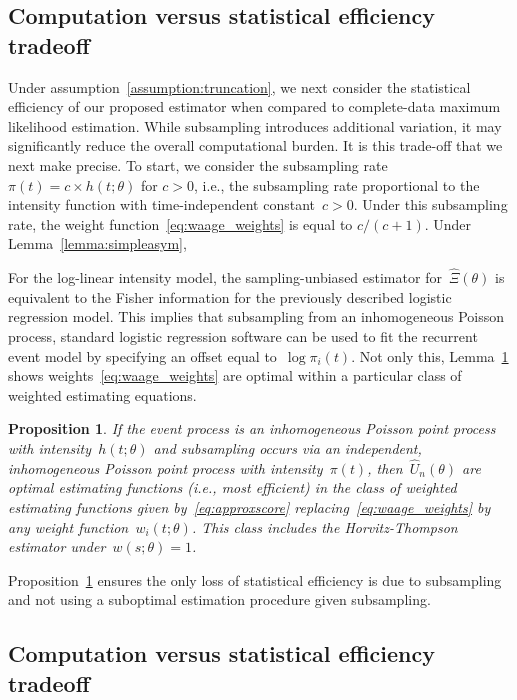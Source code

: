 \documentclass[11pt]{amsart}
\newtheorem{prop}[thm]{Proposition}
\begin{document}
\subsection{Computation versus statistical efficiency tradeoff}

Under assumption~\ref{assumption:truncation}, we next consider the statistical efficiency of our proposed estimator when compared to complete-data maximum likelihood estimation. While subsampling introduces additional variation, it may significantly reduce the overall computational burden. It is this trade-off that we next make precise. To start, we consider the subsampling rate~$\pi(t) = c \times h(t; \theta)$ for $c>0$, i.e., the subsampling rate proportional to the intensity function with time-independent constant~$c > 0$. Under this subsampling rate, the weight function~\eqref{eq:waage_weights} is equal to $c / (c+1)$. Under Lemma~\ref{lemma:simpleasym},

For the log-linear intensity model, the sampling-unbiased estimator for~$\hat \Xi(\theta)$ is equivalent to the Fisher information for the previously described logistic regression model. This implies that subsampling from an inhomogeneous Poisson process, standard logistic regression software can be used to fit the recurrent event model by specifying an offset equal to~$\log \pi_i (t)$. Not only this, Lemma~\ref{prop:optimal} shows weights~\eqref{eq:waage_weights} are optimal within a particular class of weighted estimating equations.

\begin{prop} \normalfont
\label{prop:optimal}
If the event process is an inhomogeneous Poisson point process with intensity~$h(t; \theta)$ and subsampling occurs via an independent, inhomogeneous Poisson point process with intensity~$\pi (t)$, then~$\hat U_n (\theta)$ are optimal estimating functions (i.e., most efficient) in the class of weighted estimating functions given by~\eqref{eq:approxscore} replacing~\eqref{eq:waage_weights} by any weight function~$w_i (t; \theta)$. This class includes the Horvitz-Thompson estimator under~$w(s; \theta) = 1$.
\end{prop}

\noindent Proposition~\ref{prop:optimal} ensures the only loss of statistical efficiency is due to subsampling and not using a suboptimal estimation procedure given subsampling.

\subsection{Computation versus statistical efficiency tradeoff}
\end{document}
